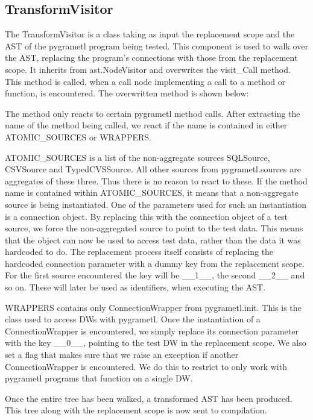 \subsection{TransformVisitor}
The TransformVisitor is a class taking as input the replacement scope and the AST of the pygrametl program being tested. This component is used to walk over the AST, replacing the program's connections with those from the replacement scope. It inherits from ast.NodeVisitor and overwrites the visit\_Call method. This method is called, when a call node implementing a call to a method or function, is encountered. The overwritten method is shown below:



The method only reacts to certain pygrametl method calls. After extracting the name of the method being called, we react if the name is contained in either ATOMIC\_SOURCES or WRAPPERS.

ATOMIC\_SOURCES is a list of the non-aggregate sources SQLSource, CSVSource and TypedCVSSource. All other sources from pygrametl.sources are aggregates of these three. Thus there is no reason to react to these. If the method name is contained within ATOMIC\_SOURCES, it means that a non-aggregate source is being instantiated. One of the parameters used for such an instantiation is a connection object. By replacing this with the connection object of a test source, we force the non-aggregated source to point to the test data. This means that the object can now be used to access test data, rather than the data it was hardcoded to do. The replacement process itself consists of replacing the hardcoded connection parameter with a dummy key from the replacement scope. For the first source encountered the key will be \_\_1\_\_, the second \_\_2\_\_ and so on. These will later be used as identifiers, when executing the AST.

WRAPPERS contains only ConnectionWrapper from pygrametl.init. This is the class used to access DWs with pygrametl. Once the instantiation of a ConnectionWrapper is encountered, we simply replace its connection parameter with the key \_\_0\_\_, pointing to the test DW in the replacement scope. We also set a flag that makes sure that we raise an exception if another ConnectionWrapper is encountered. We do this to restrict \FW{} to only work with pygrametl programs that function on a single DW.

Once the entire tree has been walked, a transformed AST has been produced. This tree along with the replacement scope is now sent to compilation.


